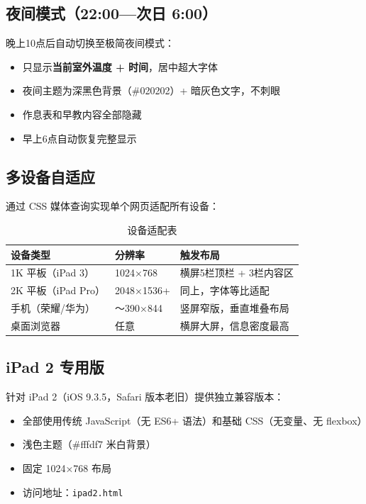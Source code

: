 \documentclass[12pt,a4paper,fontset=fandol]{ctexart}
\begin{document}
\subsection{夜间模式（22:00—次日 6:00）}

晚上10点后自动切换至极简夜间模式：

\begin{itemize}
    \item 只显示\textbf{当前室外温度 + 时间}，居中超大字体
    \item 夜间主题为深黑色背景（\#020202）+ 暗灰色文字，不刺眼
    \item 作息表和早教内容全部隐藏
    \item 早上6点自动恢复完整显示
\end{itemize}

\subsection{多设备自适应}

通过 CSS 媒体查询实现单个网页适配所有设备：

\begin{table}[htbp]
\centering
\begin{tabular}{p{2.5cm}p{3cm}p{4cm}}
\toprule
\textbf{设备类型} & \textbf{分辨率} & \textbf{触发布局} \\
\midrule
1K 平板（iPad 3） & 1024×768 & 横屏5栏顶栏 + 3栏内容区 \\
2K 平板（iPad Pro） & 2048×1536+ & 同上，字体等比适配 \\
手机（荣耀/华为） & ～390×844 & 竖屏窄版，垂直堆叠布局 \\
桌面浏览器 & 任意 & 横屏大屏，信息密度最高 \\
\bottomrule
\end{tabular}
\caption{设备适配表}
\end{table}

\subsection{iPad 2 专用版}

针对 iPad 2（iOS 9.3.5，Safari 版本老旧）提供独立兼容版本：

\begin{itemize}
    \item 全部使用传统 JavaScript（无 ES6+ 语法）和基础 CSS（无变量、无 flexbox）
    \item 浅色主题（\#fffdf7 米白背景）
    \item 固定 1024×768 布局
    \item 访问地址：\texttt{ipad2.html}
\end{itemize}
\end{document}
